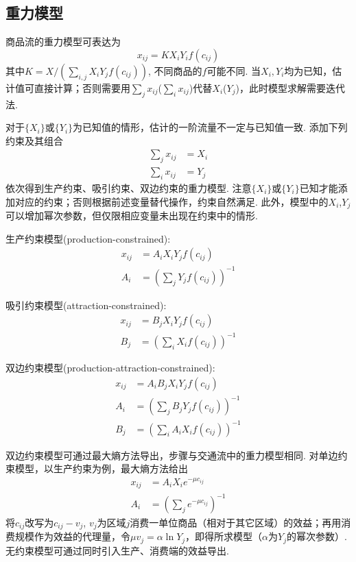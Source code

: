 \subsection{重力模型}
\par 商品流的重力模型可表达为
\begin{equation}
x_{ij}=KX_iY_if(c_{ij})
\end{equation}
其中$K=X/(\sum_{i,j} X_iY_jf(c_{ij}))$, 不同商品的$f$可能不同. 当$X_i, Y_i$均为已知，估计值可直接计算；否则需要用$\sum_{j}x_{ij}$($\sum_{i}x_{ij}$)代替$X_i$($Y_j$)，此时模型求解需要迭代法. 
\par 对于$\{X_i\}$或$\{Y_i\}$为已知值的情形，估计的一阶流量不一定与已知值一致. 添加下列约束及其组合
\begin{align}
    \sum_j x_{ij} &= X_i\\
    \sum_i x_{ij} &= Y_j
\end{align}
依次得到生产约束、吸引约束、双边约束的重力模型. 注意$\{X_i\}$或$\{Y_i\}$已知才能添加对应的约束；否则根据前述变量替代操作，约束自然满足. 此外，模型中的$X_i$,$Y_j$可以增加幂次参数，但仅限相应变量未出现在约束中的情形.
\par 生产约束模型(production-constrained):
\begin{align}
    x_{ij}&=A_iX_iY_jf(c_{ij})\\
    A_i&=\left(\sum_j Y_jf(c_{ij})\right)^{-1}
\end{align}
\par 吸引约束模型(attraction-constrained):
\begin{align}
    x_{ij}&=B_jX_iY_jf(c_{ij})\\
    B_j&=\left(\sum_i X_if(c_{ij})\right)^{-1}
\end{align}
\par 双边约束模型(production-attraction-constrained):
\begin{align}
    x_{ij}&=A_iB_jX_iY_jf(c_{ij})\\
    A_i&=\left(\sum_j B_jY_jf(c_{ij})\right)^{-1}\\
    B_j&=\left(\sum_i A_iX_if(c_{ij})\right)^{-1}
\end{align}

\par 双边约束模型可通过最大熵方法导出，步骤与交通流中的重力模型相同. 对单边约束模型，以生产约束为例，最大熵方法给出
\begin{align}
    x_{ij}&=A_iX_ie^{-\mu c_{ij}}\\
    A_i&=\left(\sum_j e^{-\mu c_{ij}}\right)^{-1}
\end{align}
将$c_{ij}$改写为$c_{ij}-v_j$, $v_j$为区域$j$消费一单位商品（相对于其它区域）的效益；再用消费规模作为效益的代理量，令$\mu v_j=\alpha \ln Y_j$，即得所求模型（$\alpha$为$Y_j$的幂次参数）. 无约束模型可通过同时引入生产、消费端的效益导出. 


